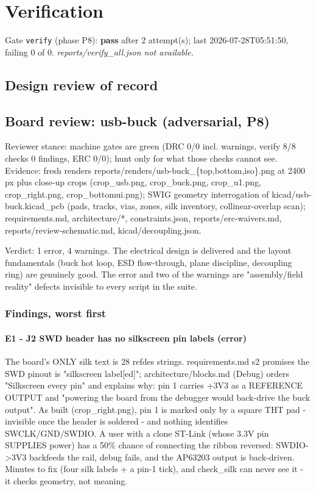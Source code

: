 \documentclass[11pt,a4paper]{article}
\begin{document}
\section{Verification}
Gate \texttt{verify} (phase P8): \textbf{pass} after 2 attempt(s); last 2026-07-28T05:51:50, failing 0 of 0.
\emph{reports/verify\_all.json not available.}
\subsection*{Design review of record}
\subsection*{Board review: usb-buck (adversarial, P8)}
Reviewer stance: machine gates are green (DRC 0/0 incl. warnings, verify 8/8 checks 0 findings, ERC 0/0); hunt only for what those checks cannot see. Evidence: fresh renders reports/renders/usb-buck\_\{top,bottom,iso\}.png at 2400 px plus close-up crops (crop\_usb.png, crop\_buck.png, crop\_u1.png, crop\_right.png, crop\_bottomui.png); SWIG geometry interrogation of kicad/usb-buck.kicad\_pcb (pads, tracks, vias, zones, silk inventory, collinear-overlap scan); requirements.md, architecture/{*}, constraints.json, reports/erc-waivers.md, reports/review-schematic.md, kicad/decoupling.json.

Verdict: 1 error, 4 warnings. The electrical design is delivered and the layout fundamentals (buck hot loop, ESD flow-through, plane discipline, decoupling ring) are genuinely good. The error and two of the warnings are "assembly/field reality" defects invisible to every script in the suite.

\subsubsection*{Findings, worst first}
\paragraph*{E1 - J2 SWD header has no silkscreen pin labels (error)}
The board's ONLY silk text is 28 refdes strings. requirements.md s2 promises the SWD pinout is "silkscreen label{[}ed{]}"; architecture/blocks.md (Debug) orders "Silkscreen every pin" and explains why: pin 1 carries +3V3 as a REFERENCE OUTPUT and "powering the board from the debugger would back-drive the buck output". As built (crop\_right.png), pin 1 is marked only by a square THT pad - invisible once the header is soldered - and nothing identifies SWCLK/GND/SWDIO. A user with a clone ST-Link (whose 3.3V pin SUPPLIES power) has a 50\% chance of connecting the ribbon reversed: SWDIO-\textgreater{}3V3 backfeeds the rail, debug fails, and the AP63203 output is back-driven. Minutes to fix (four silk labels + a pin-1 tick), and check\_silk can never see it - it checks geometry, not meaning.
\end{document}
